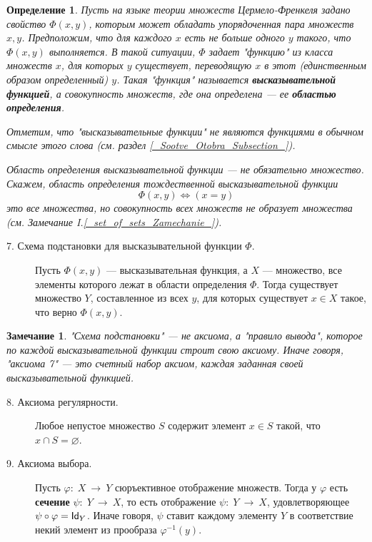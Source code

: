 \documentclass[12pt]{book}
\newcommand{\arrow}{{\:\longrightarrow\:}}
\renewcommand{\phi}{\varphi}
\renewcommand{\emptyset}{\varnothing}
\def\Id{{\operatorname{\sf Id}}}
\theoremstyle{upshape}
\newtheorem{zadacha}{Задача}[chapter]
\theoremstyle{generic}
\newtheorem{opredelenie}[teorema]{Определение}
\newtheorem{remark}[teorema]{Замечание}
\def\замечание{\begin{remark}}
\def\еза{\end{remark}}
\theoremstyle{upshapenonumber}
\newcommand{\следствие}{%
     \refstepcounter{teorema}
     {\noindent\bf Следствие \thechapter.\arabic{teorema}:\ }}
\newcommand{\пример}{%
     \refstepcounter{teorema}
     {\noindent\bf Пример \thechapter.\arabic{teorema}:\ }}
\newcommand{\лемма}{%
     \refstepcounter{teorema}
     {\noindent\bf Лемма \thechapter.\arabic{teorema}:\ }}
\newcommand{\теорема}{%
     \refstepcounter{teorema}
     {\noindent\bf Теорема \thechapter.\arabic{teorema}:\ }}
\newcommand{\утверждение}{%
     \refstepcounter{teorema}
     {\noindent\bf Утверждение \thechapter.\arabic{teorema}:\ }}
\def\бф{\bf}
\def\ем{\em}
\def\задача{\begin{zadacha}}
\def\ез{\end{zadacha}}
\def\еу{\end{ukazanie}}
\def\определение{\begin{opredelenie}}
\def\ео{\end{opredelenie}}
\def\енум{\begin{enumerate}}
\def\ее{\end{enumerate}}
\begin{document}
\определение
Пусть на языке теории множеств
Цермело-Френкеля задано свойство $\Phi(x, y)$, которым
может обладать упорядоченная пара множеств $x, y$. Предположим,
что для каждого $x$ есть не больше одного $y$ такого,
что $\Phi(x,y)$ выполняется. В такой ситуации,
$\Phi$ задает "функцию" из класса множеств $x$, 
для которых $y$ существует,
переводящую $x$ в этот (единственным
образом определенный) $y$.
Такая "функция" называется {\бф высказывательной
функцией}, а совокупность множеств, где она определена --- 
ее {\бф областью определения}. 

Отметим, что "высказывательные функции"
не являются функциями в обычном смысле этого слова
(см. раздел \ref{_Sootve_Otobra_Subsection_}).

Область определения
 высказывательной функции --- не обязательно множество.
Скажем, область определения тождественной
высказывательной функции
\[
\Phi(x,y) \Leftrightarrow (x=y)
\]
это все множества, но совокупность всех множеств
не образует множества (см. Замечание 
I.\ref{_set_of_sets_Zamechanie_}).
\ео

\begin{description}
\item[7. Схема подстановки для высказывательной функции $\Phi$.]
Пусть $\Phi(x,y)$ --- высказывательная функция, а $X$ --- 
множество, все элементы которого лежат в области
определения $\Phi$. Тогда существует множество
$Y$, составленное из всех $y$, для которых
существует $x\in X$ такое, что верно $\Phi(x,y)$.
\end{description}

\замечание
"Схема подстановки" --- не аксиома, а "правило вывода",
которое по каждой высказывательной функции строит
свою аксиому. Иначе говоря, "аксиома 7" --- это
 счетный набор аксиом, каждая заданная своей
высказывательной функцией.
\еза

\begin{description}
\item[8. Аксиома регулярности.]
Любое непустое множество $S$ содержит элемент $x\in S$
такой, что $x\cap S=\emptyset$.

\item[9. Аксиома выбора.]
Пусть $\phi:\; X \arrow Y$ сюръективное отображение
множеств. Тогда у $\phi $ есть {\бф сечение}
$\psi:\; Y\arrow X$, то есть отображение
$\psi:\; Y\arrow X$, удовлетворяющее $\psi\circ \phi =
\Id_Y$. Иначе говоря, $\psi$ ставит каждому элементу
$Y$ в соответствие некий элемент из прообраза $\phi^{-1}(y)$.
\end{description}
\end{document}
